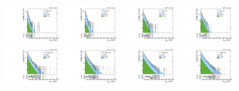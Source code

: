 \begin{figure}[htbp]
  \centering
  \includegraphics[width=0.18\textwidth]{fig/fitValidation/PostFit_SR_MVV__mu_HP_bb_LDy_Run2.pdf}
  \includegraphics[width=0.18\textwidth]{fig/fitValidation/PostFit_SR_MVV__e_HP_bb_LDy_Run2.pdf}
  \includegraphics[width=0.18\textwidth]{fig/fitValidation/PostFit_SR_MVV__mu_LP_bb_LDy_Run2.pdf}
  \includegraphics[width=0.18\textwidth]{fig/fitValidation/PostFit_SR_MVV__e_LP_bb_LDy_Run2.pdf}\\
  \includegraphics[width=0.18\textwidth]{fig/fitValidation/PostFit_SR_MVV__mu_HP_nobb_LDy_Run2.pdf}
  \includegraphics[width=0.18\textwidth]{fig/fitValidation/PostFit_SR_MVV__e_HP_nobb_LDy_Run2.pdf}
  \includegraphics[width=0.18\textwidth]{fig/fitValidation/PostFit_SR_MVV__mu_LP_nobb_LDy_Run2.pdf}
  \includegraphics[width=0.18\textwidth]{fig/fitValidation/PostFit_SR_MVV__e_LP_nobb_LDy_Run2.pdf}\\

\end{figure}
